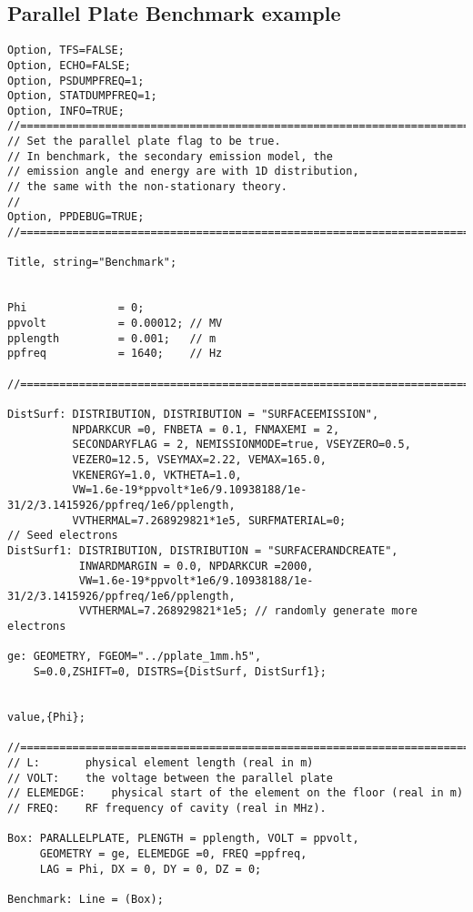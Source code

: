 \documentclass[a4paper,11pt]{article}
\begin{document}
\subsection{Parallel Plate Benchmark example}
\begin{verbatim}
Option, TFS=FALSE;
Option, ECHO=FALSE;
Option, PSDUMPFREQ=1;
Option, STATDUMPFREQ=1;
Option, INFO=TRUE;
//======================================================================
// Set the parallel plate flag to be true. 
// In benchmark, the secondary emission model, the  
// emission angle and energy are with 1D distribution,  
// the same with the non-stationary theory.
//  
Option, PPDEBUG=TRUE; 
//======================================================================

Title, string="Benchmark";


Phi              = 0;    
ppvolt           = 0.00012; // MV
pplength         = 0.001;   // m
ppfreq           = 1640;    // Hz

//======================================================================

DistSurf: DISTRIBUTION, DISTRIBUTION = "SURFACEEMISSION", 
          NPDARKCUR =0, FNBETA = 0.1, FNMAXEMI = 2, 
          SECONDARYFLAG = 2, NEMISSIONMODE=true, VSEYZERO=0.5, 
          VEZERO=12.5, VSEYMAX=2.22, VEMAX=165.0, 
          VKENERGY=1.0, VKTHETA=1.0, 
          VW=1.6e-19*ppvolt*1e6/9.10938188/1e-31/2/3.1415926/ppfreq/1e6/pplength, 
          VVTHERMAL=7.268929821*1e5, SURFMATERIAL=0; 
// Seed electrons 
DistSurf1: DISTRIBUTION, DISTRIBUTION = "SURFACERANDCREATE",
           INWARDMARGIN = 0.0, NPDARKCUR =2000, 
           VW=1.6e-19*ppvolt*1e6/9.10938188/1e-31/2/3.1415926/ppfreq/1e6/pplength, 
           VVTHERMAL=7.268929821*1e5; // randomly generate more electrons

ge: GEOMETRY, FGEOM="../pplate_1mm.h5", 
    S=0.0,ZSHIFT=0, DISTRS={DistSurf, DistSurf1};


value,{Phi};

//=======================================================================
// L:		physical element length (real in m)
// VOLT:	the voltage between the parallel plate
// ELEMEDGE:	physical start of the element on the floor (real in m)
// FREQ:	RF frequency of cavity (real in MHz).

Box: PARALLELPLATE, PLENGTH = pplength, VOLT = ppvolt, 
     GEOMETRY = ge, ELEMEDGE =0, FREQ =ppfreq, 
     LAG = Phi, DX = 0, DY = 0, DZ = 0;

Benchmark: Line = (Box);




\end{verbatim}
\end{document}
